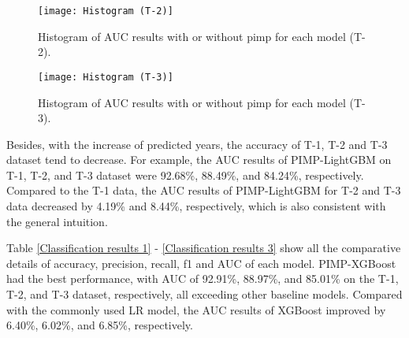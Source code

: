 \documentclass[review]{elsarticle}
\begin{document}
\begin{figure}[H]
    \centering
    \texttt{[image: Histogram (T-2)]}
    \caption{Histogram of AUC results with or without pimp for each model (T-2).}
    \label{fig: Histogram of AUC 2}
\end{figure}

\begin{figure}[H]
    \centering
    \texttt{[image: Histogram (T-3)]}
    \caption{Histogram of AUC results with or without pimp for each model (T-3).}
    \label{fig: Histogram of AUC 3}
\end{figure}

Besides, with the increase of predicted years, the accuracy of T-1, T-2 and T-3 dataset tend to decrease. For example, the AUC results of PIMP-LightGBM on T-1, T-2, and T-3 dataset were 92.68\%, 88.49\%, and 84.24\%, respectively. Compared to the T-1 data, the AUC results of PIMP-LightGBM for T-2 and T-3 data decreased by 4.19\% and 8.44\%, respectively, which is also consistent with the general intuition.

Table \ref{Classification results 1} - \ref{Classification results 3} show all the comparative details of accuracy, precision, recall, f1 and AUC of each model. PIMP-XGBoost had the best performance, with AUC of 92.91\%, 88.97\%, and 85.01\% on the T-1, T-2, and T-3 dataset, respectively, all exceeding other baseline models. Compared with the commonly used LR model, the AUC results of XGBoost improved by 6.40\%, 6.02\%, and 6.85\%, respectively.
\end{document}
